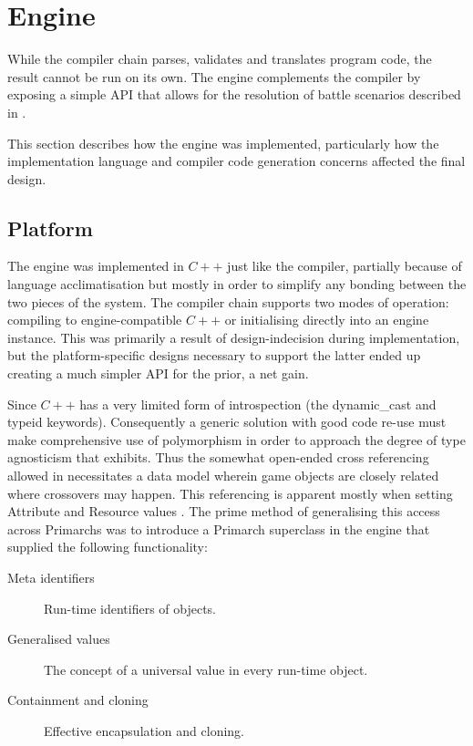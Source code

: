 \section{Engine}
While the \langname{} compiler chain parses, validates and translates program code, the result cannot be run on its own. The engine complements the compiler by exposing a simple API that allows for the resolution of battle scenarios described in \langname{}.

This section describes how the engine was implemented, particularly how the implementation language and compiler code generation concerns affected the final design.

\subsection{Platform}
The engine was implemented in $C++$ just like the compiler, partially because of language acclimatisation but mostly in order to simplify any bonding between the two pieces of the system. The compiler chain supports two modes of operation: compiling to engine-compatible $C++$ or initialising directly into an engine instance. This was primarily a result of design-indecision during implementation, but the platform-specific designs necessary to support the latter ended up creating a much simpler API for the prior, a net gain.

Since $C++$ has a very limited form of introspection (the dynamic\_cast and typeid keywords). Consequently a generic solution with good code re-use must make comprehensive use of polymorphism in order to approach the degree of type agnosticism that \langname{} exhibits. Thus the somewhat open-ended cross referencing allowed in \langname{} necessitates a data model wherein game objects are closely related where crossovers may happen. This referencing is apparent mostly when setting Attribute and Resource values . The prime method of generalising this access across Primarchs was to introduce a Primarch superclass in the engine that supplied the following functionality:
\begin{description}
	\item[Meta identifiers] Run-time identifiers of objects.
	\item[Generalised values] The concept of a universal value in every run-time object.
	\item[Containment and cloning] Effective encapsulation and cloning.
\end{description}

